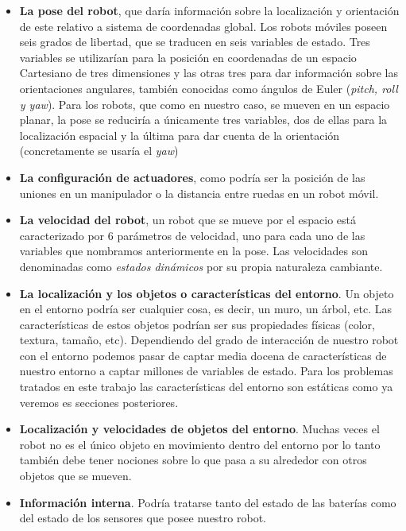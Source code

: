 \begin{itemize}
    \item \textbf{La pose del robot}, que daría información sobre la localización y orientación de este relativo a sistema de coordenadas global.
    Los robots móviles poseen seis grados de libertad, que se traducen en seis variables de estado.
    Tres variables se utilizarían para la posición en coordenadas de un espacio Cartesiano de tres dimensiones y las otras tres para dar información sobre las orientaciones angulares, también conocidas como ángulos de Euler (\textit{pitch, roll y yaw}).
%
%
%
%
%
%
%
%
%
    Para los robots, que como en nuestro caso, se mueven en un espacio planar, la pose se reduciría a únicamente tres variables, dos de ellas para la localización espacial y la última para dar cuenta de la orientación (concretamente se usaría el \textit{yaw})
    \item \textbf{La configuración de actuadores}, como podría ser la posición de las uniones en un manipulador o la distancia entre ruedas en un robot móvil.
    \item \textbf{La velocidad del robot}, un robot que se mueve por el espacio está caracterizado por 6 parámetros de velocidad, uno para cada uno de las variables que nombramos anteriormente en la pose.
    Las velocidades son denominadas como \textit{estados dinámicos} por su propia naturaleza cambiante.
    \item \textbf{La localización y los objetos o características del entorno}.
%
%
%
    Un objeto en el entorno podría ser cualquier cosa, es decir, un muro, un árbol, etc.
    Las características de estos objetos podrían ser sus propiedades físicas (color, textura, tamaño, etc). Dependiendo del grado de interacción de nuestro robot con el entorno podemos pasar de captar media docena de características de nuestro entorno a captar millones de variables de estado. Para los problemas tratados en este trabajo las características del entorno son estáticas como ya veremos es secciones posteriores.
    \item \textbf{Localización y velocidades de objetos del entorno}. Muchas veces el robot no es el único objeto en movimiento dentro del entorno por lo tanto también debe tener nociones sobre lo que pasa a su alrededor con otros objetos que se mueven.
    \item \textbf{Información interna}. Podría tratarse tanto del estado de las baterías como del estado de los sensores que posee nuestro robot.
\end{itemize}
